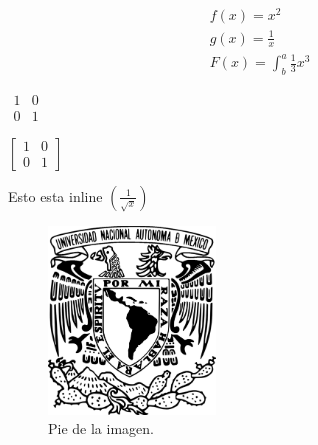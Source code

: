 \documentclass[a4paper,11pt]{article}                 %
\begin{document}
  \begin{align*}                                     %
    f(x) = x^2\\
    g(x) = \frac{1}{x}\\
    F(x) = \int^a_b \frac{1}{3}x^3
  \end{align*}

  \begin{center}
    $
      \begin{matrix}
        1 & 0\\
        0 & 1
      \end{matrix}
    $
  \end{center}
  \begin{center}
    $
      \left[
        \begin{matrix}
          1 & 0\\
          0 & 1
        \end{matrix}
      \right]
    $  
  \end{center}
  
  Esto esta inline $\left(\frac{1}{\sqrt{x}}\right)$  %
  
  \begin{figure}[H]
    \centering                                        %
    \includegraphics[height=5cm]{../images/escudo-unam}  %
    \caption{Pie de la imagen.}                       %
    \label{fig:fig1}                                  %
  \end{figure}
\end{document}
